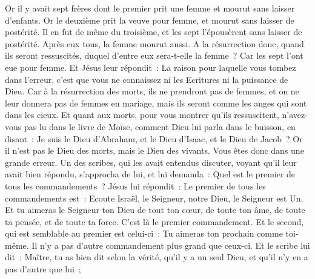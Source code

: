 \begin{multicols}{2}
Or il y avait sept frères dont le premier prit une femme et mourut sans laisser d'enfants.
Or le deuxième prit la veuve pour femme, et mourut sans laisser de postérité. Il en fut de même du troisième,
et les sept l'épousèrent sans laisser de postérité. Après eux tous, la femme mourut aussi.
A la résurrection donc, quand ils seront ressuscités, duquel d'entre eux sera-t-elle la femme~? Car les sept l'ont eue pour femme.
Et Jésus leur répondit~: La raison pour laquelle vous tombez dans l'erreur, c'est que vous ne connaissez ni les Ecritures ni la puissance de Dieu.
Car à la résurrection des morts, ils ne prendront pas de femmes, et on ne leur donnera pas de femmes en mariage, mais ils seront comme les anges qui sont dans les cieux.
Et quant aux morts, pour vous montrer qu'ils ressuscitent, n'avez-vous pas lu dans le livre de Moïse, comment Dieu lui parla dans le buisson, en disant~: Je suis le Dieu d'Abraham, et le Dieu d'Isaac, et le Dieu de Jacob~?
Or il n'est pas le Dieu des morts, mais le Dieu des vivants. Vous êtes donc dans une grande erreur.
Un des scribes, qui les avait entendus discuter, voyant qu'il leur avait bien répondu, s'approcha de lui, et lui demanda~: Quel est le premier de tous les commandements~?
Jésus lui répondit~: Le premier de tous les commandements est~: Ecoute Israël, le Seigneur, notre Dieu, le Seigneur est Un.
Et tu aimeras le Seigneur ton Dieu de tout ton cœur, de toute ton âme, de toute ta pensée, et de toute ta force. C'est là le premier commandement.
Et le second, qui est semblable au premier est celui-ci~: Tu aimeras ton prochain comme toi-même. Il n'y a pas d'autre commandement plus grand que ceux-ci.
Et le scribe lui dit~: Maître, tu as bien dit selon la vérité, qu'il y a un seul Dieu, et qu'il n'y en a pas d'autre que lui~;

\end{multicols}
